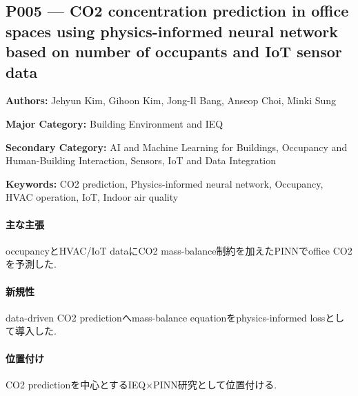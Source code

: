 \subsection{P005 --- CO2 concentration prediction in office spaces using physics-informed neural network based on number of occupants and IoT sensor data}
\label{paper:P005}
\textbf{Authors:} Jehyun Kim, Gihoon Kim, Jong-Il Bang, Anseop Choi, Minki Sung\par
\textbf{Major Category:} Building Environment and IEQ\par
\textbf{Secondary Category:} AI and Machine Learning for Buildings, Occupancy and Human-Building Interaction, Sensors, IoT and Data Integration\par
\textbf{Keywords:} CO2 prediction, Physics-informed neural network, Occupancy, HVAC operation, IoT, Indoor air quality\par
\paragraph{主な主張}
occupancyとHVAC/IoT dataにCO2 mass-balance制約を加えたPINNでoffice CO2を予測した. \cite{Kim:2026CO2PINN}
\paragraph{新規性}
data-driven CO2 predictionへmass-balance equationをphysics-informed lossとして導入した.
\paragraph{位置付け}
CO2 predictionを中心とするIEQ×PINN研究として位置付ける.
